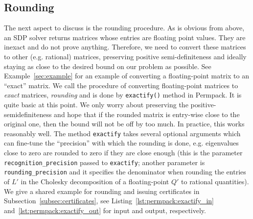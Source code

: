 \documentclass[12pt, a4paper, twoside]{report}
\begin{document}
\subsection{Rounding}
The next aspect to discuss is the rounding procedure. As is obvious from above, an SDP solver returns matrices whose entries are floating point values. They are inexact and do not prove anything. Therefore, we need to convert these matrices to other (e.g. rational) matrices, preserving positive semi-definiteness and ideally staying as close to the desired bound on our problem as possible. See Example~\ref{sec:example} for an example of converting a floating-point matrix to an ``exact'' matrix. We call the procedure of converting floating-point matrices to \emph{exact} matrices, \emph{rounding} and is done by \texttt{exactify()} method in Permpack. It is quite basic at this point. We only worry about preserving the positive-semidefiniteness and hope that if the rounded matrix is entry-wise close to the original one, then the bound will not be off by too much. In practice, this works reasonably well. The method \texttt{exactify} takes several optional arguments which can fine-tune the ``precision'' with which the rounding is done, e.g. eigenvalues close to zero are rounded to zero if they are close enough (this is the parameter \texttt{recognition\_precision} passed to \texttt{exactify}; another parameter is \texttt{rounding\_precision} and it specifies the denominator when rounding the entries of $L'$ in the Cholesky decomposition of a floating-point $Q'$ to rational quantities). We give a shared example for rounding and issuing certificates in Subsection~\ref{subsec:certificates}, see Listing~\ref{lst:permpack:exactify_in} and~\ref{lst:permpack:exactify_out} for input and output, respectively.
\end{document}
